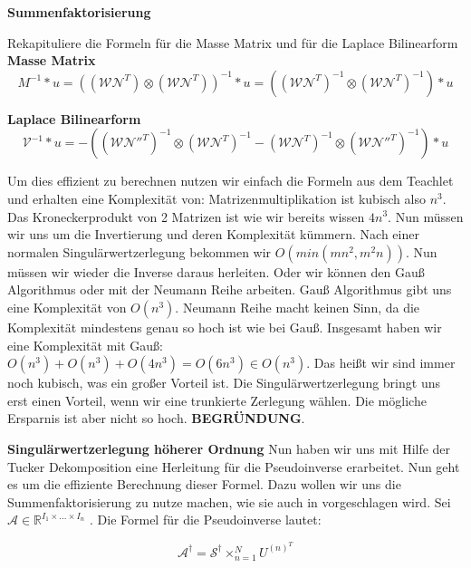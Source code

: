 \textbf{Summenfaktorisierung}

Rekapituliere die Formeln für die Masse Matrix und für die Laplace Bilinearform \\
\textbf{Masse Matrix} 
\begin{equation*}
M^{-1}*u = ((\mathcal{W} \mathcal{N}^{T}) \otimes (\mathcal{W} \mathcal{N}^{T}))^{-1}*u
= ((\mathcal{W} \mathcal{N}^{T})^{-1} \otimes (\mathcal{W} \mathcal{N}^{T})^{-1})*u
\end{equation*}

\textbf{Laplace Bilinearform}
\begin{equation*}
\mathcal{V}^{-1}*u =  -((\mathcal{W} \mathcal{N''}^{T})^{-1} \otimes (\mathcal{W} \mathcal{N}^{T})^{-1} - (\mathcal{W} \mathcal{N}^{T})^{-1} \otimes (\mathcal{W} \mathcal{N''}^{T})^{-1})*u
\end{equation*}

Um dies effizient zu berechnen nutzen wir einfach die Formeln aus dem Teachlet und erhalten eine Komplexität von:
Matrizenmultiplikation ist kubisch also $n^3$. Das Kroneckerprodukt von 2 Matrizen ist wie wir bereits wissen $4n^3$. Nun müssen wir uns um die Invertierung und deren Komplexität kümmern. Nach einer normalen Singulärwertzerlegung bekommen wir $O(min(mn^2,m^2 n))$. Nun müssen wir wieder die Inverse daraus herleiten. 
Oder wir können den Gauß Algorithmus oder mit der Neumann Reihe arbeiten. Gauß Algorithmus gibt uns eine Komplexität von $O(n^3)$. Neumann Reihe macht keinen Sinn, da die Komplexität mindestens genau so hoch ist wie bei Gauß.
Insgesamt haben wir eine Komplexität mit Gauß: $O(n^3)+O(n^3)+O(4n^3)=O(6n^3) \in O(n^3)$. Das heißt wir sind immer noch kubisch, was ein großer Vorteil ist.
Die Singulärwertzerlegung bringt uns erst einen Vorteil, wenn wir eine trunkierte Zerlegung wählen. Die mögliche Ersparnis ist aber nicht so hoch. \textbf{BEGRÜNDUNG}.

\textbf{Singulärwertzerlegung höherer Ordnung}
Nun haben wir uns mit Hilfe der Tucker Dekomposition eine Herleitung für die Pseudoinverse erarbeitet. Nun geht es um die effiziente Berechnung dieser Formel. Dazu wollen wir uns die Summenfaktorisierung zu nutze machen, wie sie auch in \cite[9-11]{Teachlet} vorgeschlagen wird.
Sei $\mathcal{A} \in \mathbb{R}^{I_{1} \times \dots \times I_{n}}$ .
Die Formel für die Pseudoinverse lautet:

\begin{equation} \label{eq:pinv}
\mathcal{A}^{\dagger} = \mathcal{S}^{\dagger} \times_{n=1}^{N} U^{ (n) ^{T} }
\end{equation}

